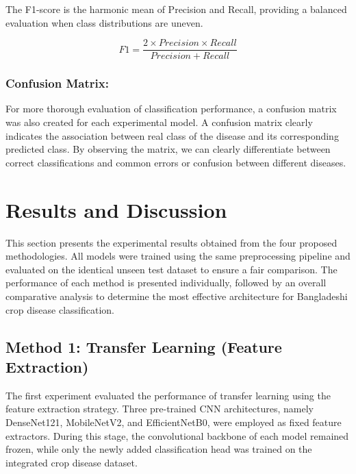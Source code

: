 The F1-score is the harmonic mean of Precision and Recall, providing a balanced evaluation when class distributions are uneven.

\begin{equation}
F1 = \frac{2 \times Precision \times Recall}{Precision + Recall}
\end{equation}

\subsubsection{Confusion Matrix:}

For more thorough evaluation of classification performance, a confusion matrix was also created for each experimental model. A confusion matrix clearly indicates the association between real class of the disease and its corresponding predicted class. By observing the matrix, we can clearly differentiate between correct classifications and common errors or confusion between different diseases.



\section{Results and Discussion}
This section presents the experimental results obtained from the four proposed methodologies. All models were trained using the same preprocessing pipeline and evaluated on the identical unseen test dataset to ensure a fair comparison. The performance of each method is presented individually, followed by an overall comparative analysis to determine the most effective architecture for Bangladeshi crop disease classification.


\subsection{Method 1: Transfer Learning (Feature Extraction)}

The first experiment evaluated the performance of transfer learning using the feature extraction strategy. Three pre-trained CNN architectures, namely DenseNet121, MobileNetV2, and EfficientNetB0, were employed as fixed feature extractors. During this stage, the convolutional backbone of each model remained frozen, while only the newly added classification head was trained on the integrated crop disease dataset.

